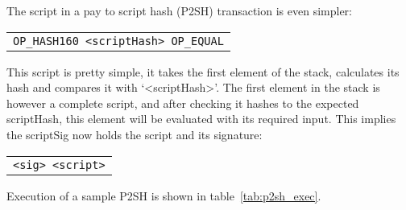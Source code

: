 The script in a pay to script hash (P2SH) transaction is even simpler:
\begin{center}
	\begin{tabular}{|c|}
		\texttt{OP\_HASH160 <scriptHash> OP\_EQUAL}
	\end{tabular}
\end{center}
This script is pretty simple, it takes the first element of the stack,
  calculates its hash and compares it with `<scriptHash>'. The first
  element in the stack is however a complete script, and after checking
  it hashes to the expected scriptHash, this element will be evaluated with its
  required input. This implies the scriptSig now holds the script and
  its signature:

\begin{center}
	\begin{tabular}{|c|}
		\texttt{<sig> <script>}
	\end{tabular}
\end{center}


  Execution of a sample P2SH is shown in table~\ref{tab:p2sh_exec}.

